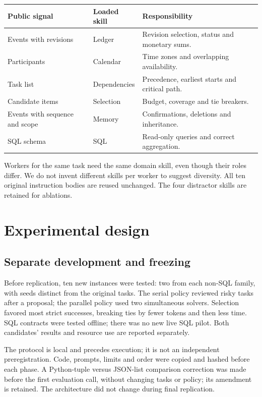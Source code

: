 \documentclass[11pt,a4paper]{article}
\begin{document}
\begin{center}\small
\begin{tabularx}{\linewidth}{@{}p{32mm}p{28mm}X@{}}
\toprule Public signal & Loaded skill & Responsibility \\ \midrule
Events with revisions & Ledger & Revision selection, status and monetary sums. \\
Participants & Calendar & Time zones and overlapping availability. \\
Task list & Dependencies & Precedence, earliest starts and critical path. \\
Candidate items & Selection & Budget, coverage and tie breakers. \\
Events with sequence and scope & Memory & Confirmations, deletions and inheritance. \\
SQL schema & SQL & Read-only queries and correct aggregation. \\
\bottomrule
\end{tabularx}\end{center}

Workers for the same task need the same domain skill, even though their roles
differ. We do not invent different skills per worker to suggest diversity.
All ten original instruction bodies are reused unchanged. The four distractor
skills are retained for ablations.

\section{Experimental design}
\subsection{Separate development and freezing}
Before replication, ten new instances were tested: two from each non-SQL family,
with seeds distinct from the original tasks. The serial policy reviewed risky
tasks after a proposal; the parallel policy used two simultaneous solvers.
Selection favored most strict successes, breaking ties by fewer tokens and then
less time. SQL contracts were tested offline; there was no new live SQL pilot.
Both candidates' results and resource use are reported separately.

The protocol is local and precedes execution; it is not an independent
preregistration. Code, prompts, limits and order were copied and hashed before each
phase. A Python-tuple versus JSON-list comparison correction was made before the
first evaluation call, without changing tasks or policy; its amendment is retained.
The architecture did not change during final replication.
\end{document}
